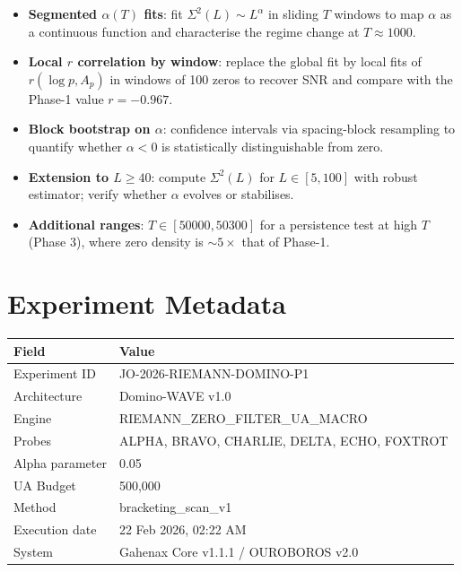 \documentclass[12pt, a4paper]{article}
\begin{document}
\begin{itemize}
  \item \textbf{Segmented $\alpha(T)$ fits}: fit $\Sigma^2(L)\sim L^\alpha$
        in sliding $T$ windows to map $\alpha$ as a continuous function
        and characterise the regime change at $T\approx 1000$.
  \item \textbf{Local $r$ correlation by window}: replace the global fit
        by local fits of $r(\log p, A_p)$ in windows of 100 zeros to
        recover SNR and compare with the Phase-1 value $r=-0.967$.
  \item \textbf{Block bootstrap on $\alpha$}: confidence intervals via
        spacing-block resampling to quantify whether $\alpha < 0$ is
        statistically distinguishable from zero.
  \item \textbf{Extension to $L\geq 40$}: compute $\Sigma^2(L)$ for
        $L\in[5,100]$ with robust estimator; verify whether $\alpha$
        evolves or stabilises.
  \item \textbf{Additional ranges}: $T\in[50000,50300]$ for a persistence
        test at high $T$ (Phase 3), where zero density is $\sim 5\times$
        that of Phase-1.
\end{itemize}

\section*{Experiment Metadata}

\begin{table}[H]
\centering
\begin{tabular}{ll}
\toprule
\textbf{Field} & \textbf{Value} \\
\midrule
Experiment ID    & JO-2026-RIEMANN-DOMINO-P1 \\
Architecture     & Domino-WAVE v1.0 \\
Engine           & RIEMANN\_ZERO\_FILTER\_UA\_MACRO \\
Probes           & ALPHA, BRAVO, CHARLIE, DELTA, ECHO, FOXTROT \\
Alpha parameter  & 0.05 \\
UA Budget        & 500,000 \\
Method           & bracketing\_scan\_v1 \\
Execution date   & 22 Feb 2026, 02:22 AM \\
System           & Gahenax Core v1.1.1 / OUROBOROS v2.0 \\
\bottomrule
\end{tabular}
\end{table}
\end{document}
